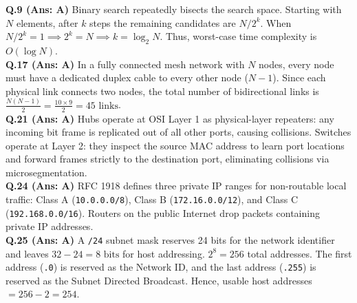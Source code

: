 \begin{solutionbox}
\textbf{Q.9 (Ans: A)} Binary search repeatedly bisects the search space. Starting with $N$ elements, after $k$ steps the remaining candidates are $N / 2^k$. When $N / 2^k = 1 \implies 2^k = N \implies k = \log_2 N$. Thus, worst-case time complexity is $O(\log N)$.\\[2mm]
\textbf{Q.17 (Ans: A)} In a fully connected mesh network with $N$ nodes, every node must have a dedicated duplex cable to every other node ($N - 1$). Since each physical link connects two nodes, the total number of bidirectional links is $\frac{N(N - 1)}{2} = \frac{10 \times 9}{2} = 45\text{ links}$.\\[2mm]
\textbf{Q.21 (Ans: A)} Hubs operate at OSI Layer 1 as physical-layer repeaters: any incoming bit frame is replicated out of all other ports, causing collisions. Switches operate at Layer 2: they inspect the source MAC address to learn port locations and forward frames strictly to the destination port, eliminating collisions via microsegmentation.\\[2mm]
\textbf{Q.24 (Ans: A)} RFC 1918 defines three private IP ranges for non-routable local traffic: Class A (\texttt{10.0.0.0/8}), Class B (\texttt{172.16.0.0/12}), and Class C (\texttt{192.168.0.0/16}). Routers on the public Internet drop packets containing private IP addresses.\\[2mm]
\textbf{Q.25 (Ans: A)} A \texttt{/24} subnet mask reserves 24 bits for the network identifier and leaves $32 - 24 = 8\text{ bits}$ for host addressing. $2^8 = 256$ total addresses. The first address (\texttt{.0}) is reserved as the Network ID, and the last address (\texttt{.255}) is reserved as the Subnet Directed Broadcast. Hence, usable host addresses $= 256 - 2 = 254$.
\end{solutionbox}

\newpage
